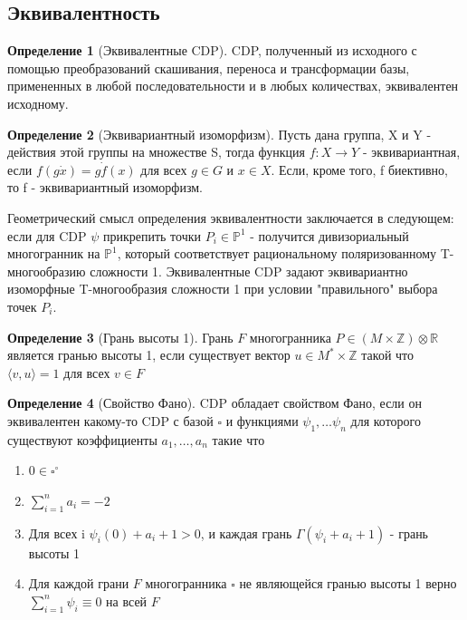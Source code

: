 \documentclass[fontsize=14pt]{scrartcl}
\theoremstyle{definition}
\newtheorem{definition}{Определение}[section]
\begin{document}
\subsection{Эквивалентность}
\begin{definition}[Эквивалентные CDP]
CDP, полученный из исходного с помощью преобразований скашивания, переноса и трансформации базы, примененных в любой последовательности и в любых количествах, эквивалентен исходному.
\end{definition}

\begin{definition}[Эквивариантный изоморфизм]
Пусть дана группа, X и Y - действия этой группы на множестве S, тогда функция $f: X \rightarrow Y$ - эквивариантная, если $f(g\dot x) = g \dot f(x)$ для всех $g \in G$ и $x \in X$. Если, кроме того, f биективно, то f - эквивариантный изоморфизм.
\end{definition}

Геометрический смысл определения эквивалентности заключается в следующем: если для CDP $\psi$ прикрепить точки $P_i \in \mathds{P}^1$ - получится дивизориальный многогранник на $\mathds{P}^1$, который соответствует рациональному поляризованному T-многообразию сложности 1. Эквивалентные CDP задают эквивариантно изоморфные T-многообразия сложности 1 при условии "правильного" выбора точек $P_i$.

\begin{definition}[Грань высоты 1]
	Грань $F$ многогранника $P \in (M \times \mathds{Z}) \otimes \mathds{R}$ является гранью высоты 1, если существует вектор $u \in M^* \times \mathds{Z}$ такой что $\langle v, u\rangle = 1$ для всех $v \in F$
\end{definition}

\begin{definition}[Свойство Фано]
CDP обладает свойством Фано, если он эквивалентен какому-то CDP с базой $\square$ и функциями $\psi_1, \dots \psi_n$ для которого существуют коэффициенты $a_1, \dots, a_n$ такие что 
\begin{enumerate}
	\item $0 \in \square^{\circ}$
	\item $\sum_{i=1}^n a_i = -2$
	\item Для всех i $\psi_i(0) + a_i + 1 > 0$, и каждая грань $\Gamma(\psi_i + a_i + 1)$ - грань высоты 1
	\item Для каждой грани $F$ многогранника $\square$ не являющейся гранью высоты 1 верно $\sum_{i=1}^n \psi_i \equiv 0$ на всей $F$
\end{enumerate}
\end{definition}
\end{document}
